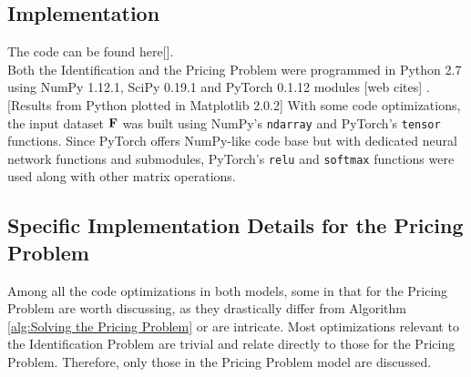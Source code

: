 \begin{appendices}
    \section{Implementation} \label{sec:Implementation}
    The code can be found here[]. \\
    Both the Identification and the Pricing Problem were programmed in Python 2.7 using NumPy 1.12.1, SciPy 0.19.1 and PyTorch 0.1.12 modules [web cites] \cite{SCPOptimizeDocs}\cite{NPDocs}. [Results from Python plotted in Matplotlib 2.0.2] With some code optimizations, the input dataset $\mathbf{F}$ was built using NumPy's \texttt{ndarray} and PyTorch's \texttt{tensor} functions. Since PyTorch offers NumPy-like code base but with dedicated neural network functions and submodules, PyTorch's \texttt{relu} and \texttt{softmax} functions were used along with other matrix operations.\\
    
    \subsection{Specific Implementation Details for the Pricing Problem}
    Among all the code optimizations in both models, some in that for the Pricing Problem are worth discussing, as they drastically differ from Algorithm \ref{alg:Solving the Pricing Problem} or are intricate. Most optimizations relevant to the Identification Problem are trivial and relate directly to those for the Pricing Problem. Therefore, only those in the Pricing Problem model are discussed.
    

\end{appendices}
